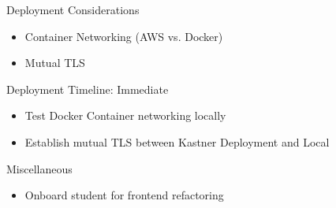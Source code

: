 \begin{frame}{Deployment Considerations}
    \begin{itemize}
        \item Container Networking (AWS vs. Docker)
        \item Mutual TLS
    \end{itemize}     
\end{frame}

\begin{frame}{Deployment Timeline: Immediate}
    \begin{itemize}
        \item Test Docker Container networking locally
        \item Establish mutual TLS between Kastner Deployment and Local
    \end{itemize}
\end{frame}

\begin{frame}{Miscellaneous}
    \begin{itemize}
        \item Onboard student for frontend refactoring
    \end{itemize}
\end{frame}





